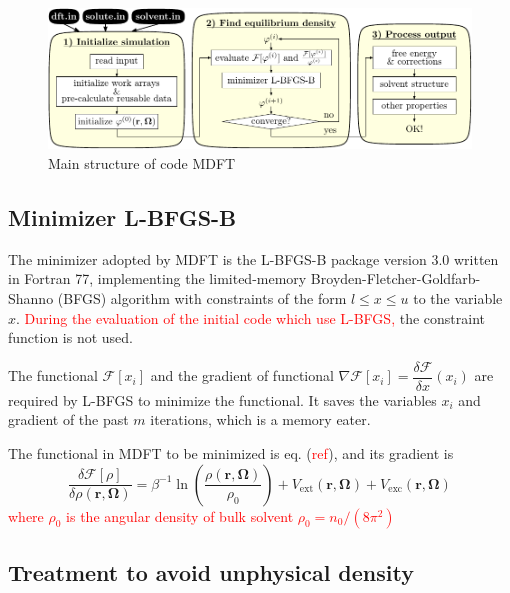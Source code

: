 \begin{figure}[h]
\begin{centering}
\includegraphics{_figure/mdft}
\par\end{centering}

\caption{Main structure of code MDFT\label{fig:code-mdft}}
\end{figure}



\subsection{Minimizer L-BFGS-B}

The minimizer adopted by MDFT is the L-BFGS-B \citep{Zhu_1994_bfgs,Zhu_bfgs_1997_algorithm}
package version 3.0 written in Fortran 77, implementing the limited-memory
Broyden-Fletcher-Goldfarb-Shanno (BFGS) algorithm with constraints
of the form $l\leq x\leq u$ to the variable $x$. \textcolor{red}{During
the evaluation of the initial code which use L-BFGS,} the constraint
function is not used.

The functional $\mathcal{F}[x_{i}]$ and the gradient of functional
$\nabla\mathcal{F}[x_{i}]=\dfrac{\delta\mathcal{F}}{\delta x}(x_{i})$
are required by L-BFGS to minimize the functional. It saves the variables
$x_{i}$ and gradient of the past $m$ iterations, which is a memory
eater.

The functional in MDFT to be minimized is eq. (\textcolor{red}{ref}),
and its gradient is
\begin{equation}
\frac{\delta\mathcal{F}[\rho]}{\delta\rho(\mathbf{r},\mathbf{\Omega})}=\beta^{-1}\ln\left(\dfrac{\rho(\mathbf{r},\mathbf{\Omega})}{\rho_{0}}\right)+V_{\mathrm{ext}}(\mathbf{r},\mathbf{\Omega})+V_{\mathrm{exc}}(\mathbf{r},\mathbf{\Omega})
\end{equation}
\textcolor{red}{where $\rho_{0}$ is the angular density of bulk solvent
$\rho_{0}=n_{0}/\left(8\pi^{2}\right)$}


\subsection{Treatment to avoid unphysical density}

